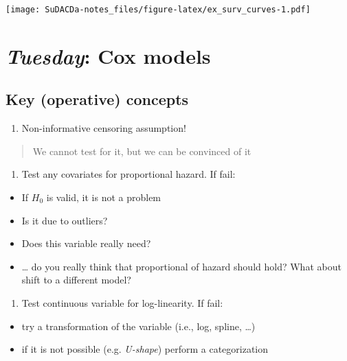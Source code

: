 \documentclass[]{book}
\providecommand{\tightlist}{%
  \setlength{\itemsep}{0pt}\setlength{\parskip}{0pt}}
\theoremstyle{definition}
\theoremstyle{definition}
\theoremstyle{definition}
\theoremstyle{remark}
\begin{document}
\texttt{[image: SuDACDa-notes\_files/figure-latex/ex\_surv\_curves-1.pdf]}

\chapter{\texorpdfstring{\emph{Tuesday}: Cox
models}{Tuesday: Cox models}}\label{cox}

\section{Key (operative) concepts}\label{key2}

\begin{enumerate}
\def\labelenumi{\arabic{enumi}.}
\tightlist
\item
  Non-informative censoring assumption!
\end{enumerate}

\begin{quote}
We cannot test for it, but we can be convinced of it
\end{quote}

\begin{enumerate}
\def\labelenumi{\arabic{enumi}.}
\setcounter{enumi}{1}
\tightlist
\item
  Test any covariates for proportional hazard. If fail:
\end{enumerate}

\begin{itemize}
\tightlist
\item
  If \(H_0\) is valid, it is not a problem
\item
  Is it due to outliers?
\item
  Does this variable really need?
\item
  \ldots{} do you really think that proportional of hazard should hold?
  What about shift to a different model?
\end{itemize}

\begin{enumerate}
\def\labelenumi{\arabic{enumi}.}
\setcounter{enumi}{2}
\tightlist
\item
  Test continuous variable for log-linearity. If fail:
\end{enumerate}

\begin{itemize}
\tightlist
\item
  try a transformation of the variable (i.e., log, spline, \ldots{})
\item
  if it is not possible (e.g. \emph{U-shape}) perform a categorization
\end{itemize}
\end{document}
